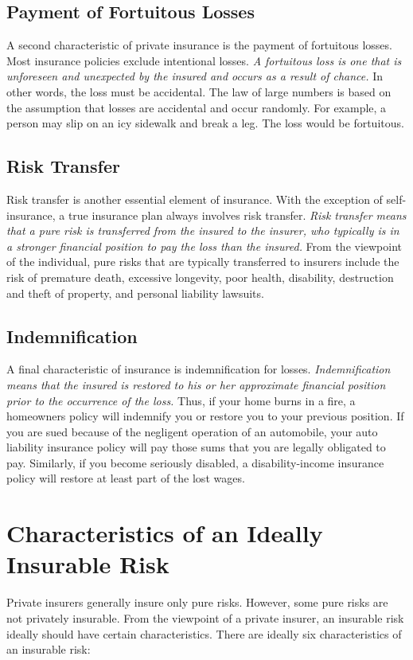 \subsection{Payment of Fortuitous Losses}
A second characteristic of private insurance is the payment of fortuitous losses. Most insurance policies exclude intentional losses. \textit{A fortuitous loss is one that is unforeseen and unexpected by the insured and occurs as a result of chance.} In other words, the loss must be accidental. The law of large numbers is based on the assumption that losses are accidental and occur randomly. For example, a person may slip on an icy sidewalk and break a leg. The loss would be fortuitous.
%
\subsection{Risk Transfer}
Risk transfer is another essential element of insurance. With the exception of self-insurance, a true insurance plan always involves risk transfer. \textit{Risk transfer means that a pure risk is transferred from the insured to the insurer, who typically is in a stronger financial position to pay the loss than the insured.} From the viewpoint of the individual, pure risks that are typically transferred to insurers include the risk of premature death, excessive longevity, poor health, disability, destruction and theft of property, and personal liability lawsuits.
%
\subsection{Indemnification}
A final characteristic of insurance is indemnification for losses. \textit{Indemnification means that the insured is restored to his or her approximate financial position prior to the occurrence of the loss.} Thus, if your home burns in a fire, a homeowners policy will indemnify you or restore you to your previous position. If you are sued because of the negligent operation of an automobile, your auto liability insurance policy will pay those sums that you are legally obligated to pay. Similarly, if you become seriously disabled, a disability-income insurance policy will restore at least part of the lost wages.
%
\section{Characteristics of an Ideally Insurable Risk}
Private insurers generally insure only pure risks. However, some pure risks are not privately insurable. From the viewpoint of a private insurer, an insurable risk ideally should have certain characteristics. There are ideally six characteristics of an insurable risk:
%
